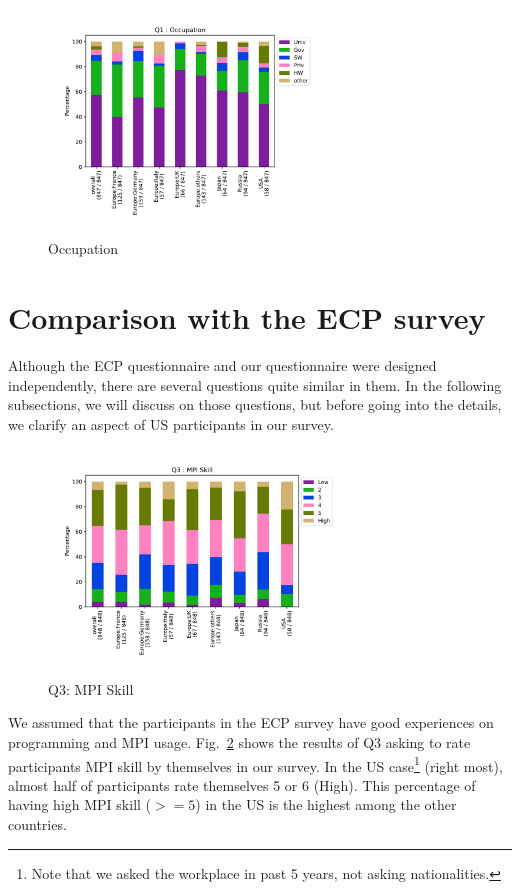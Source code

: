 \documentclass[conference,10pt,letterpaper]{IEEEtran}
\begin{document}
\begin{figure}[htb]
\begin{center}
\includegraphics[width=8cm]{Figs/Q1-enlarged.pdf}
\caption{Occupation}
\label{fig:occupation}
\end{center}
\end{figure}

\section{Comparison with the ECP survey}

Although the ECP questionnaire and our questionnaire were designed
independently, there are several questions quite similar in them. 
In the following subsections, we will discuss on those questions, but
before going into the details, we clarify an aspect of US 
participants in our survey.

\begin{figure}[htb]
\begin{center}
\includegraphics[width=8cm]{Figs/Q3-enlarged.pdf}
\caption{Q3: MPI Skill}
\label{fig:mpi-skill}
\end{center}
\end{figure}

We assumed that the participants in the ECP survey have good
experiences on programming and MPI usage. Fig.~\ref{fig:mpi-skill}
shows the results of Q3 asking to rate participants MPI skill by
themselves in our survey.  In the US case\footnote{Note that we asked
  the workplace in past 5 years, not asking nationalities.} (right
most), almost half of participants rate themselves 5 or 6
(High). This percentage of having high MPI skill ($>=5$) in the US is
the highest among the other countries.
\end{document}

